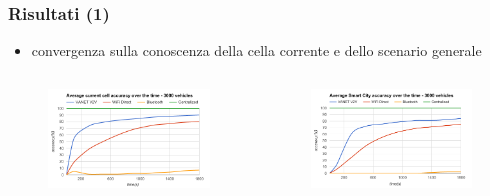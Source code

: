 \documentclass{beamer}
\begin{document}
\begin{frame}
\frametitle{Risultati (1)}
\begin{itemize}
  \item convergenza sulla conoscenza della cella corrente e dello scenario generale
\end{itemize}
\begin{columns}
  \begin{column}{0.45\textwidth}
    \begin{figure}
    \includegraphics[width=\columnwidth]{img/graphics/local_accuracy.png}
    \end{figure}
    
  \end{column}
  \begin{column}{0.45\textwidth}
    \begin{figure}
    \includegraphics[width=\columnwidth]{img/graphics/global_accuracy.png}
    \end{figure}
  \end{column}
\end{columns}
\end{frame}
\end{document}
